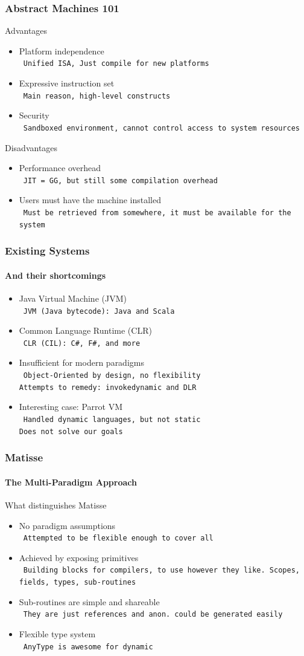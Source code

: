 \documentclass{beamer}
\newcommand{\n}[1]{\leavevmode\\~\texttt{\color{red}\tiny #1}}
\begin{document}
\begin{frame}
  \frametitle{Abstract Machines 101}

  Advantages
  \begin{itemize}[<+->]
  \item Platform independence
    \n{Unified ISA, Just compile for new platforms}
  \item Expressive instruction set
    \n{Main reason, high-level constructs}
  \item Security
    \n{Sandboxed environment, cannot control access to system resources}
  \end{itemize}


  Disadvantages
  \begin{itemize}[<+->]
  \item Performance overhead
    \n{JIT = GG, but still some compilation overhead}
  \item Users must have the machine installed
    \n{Must be retrieved from somewhere, it must be available for the system}
  \end{itemize}

\end{frame}

\begin{frame}
  \frametitle{Existing Systems}
  \framesubtitle{And their shortcomings}

  \begin{itemize}[<+->]
  \item Java Virtual Machine (JVM)
    \n{JVM (Java bytecode): Java and Scala}
  \item Common Language Runtime (CLR)
    \n{CLR (CIL): C\#, F\#, and more}
  \item Insufficient for modern paradigms
    \n{Object-Oriented by design, no flexibility\\
       Attempts to remedy: {\tt invokedynamic} and DLR
    }
  \item Interesting case: Parrot VM
    \n{Handled dynamic languages, but not static\\
       Does not solve our goals
     }
  \end{itemize}
\end{frame}

\begin{frame}
  \frametitle{Matisse}
  \framesubtitle{The Multi-Paradigm Approach}

  What distinguishes Matisse
  \begin{itemize}[<+->]
  \item No paradigm assumptions
    \n{Attempted to be flexible enough to cover all}
  \item Achieved by exposing primitives
    \n{Building blocks for compilers, to use however they like. Scopes, fields, types, sub-routines}
  \item Sub-routines are simple and shareable
    \n{They are just references and anon. could be generated easily}
  \item Flexible type system
    \n{AnyType is awesome for dynamic}
  \end{itemize}
\end{frame}
\end{document}
